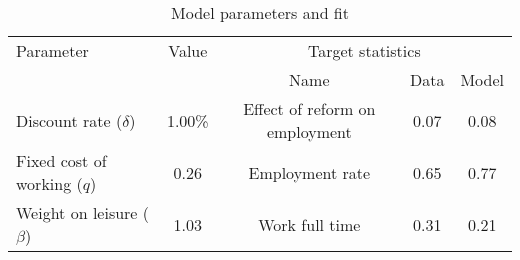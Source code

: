 \begin{table}[htbp]\caption{Model parameters and fit}\label{table:model_param}\centering\footnotesize\begin{tabular}{lcccc} \toprule  Parameter & Value & \multicolumn{3}{c}{Target statistics}  \\\cline{3-5}  &  &  Name & Data & Model  \\\midrule    Discount rate ($\delta$)      &1.00\%& Effect of reform on employment   & 0.07 &0.08\\ Fixed cost of working ($q$)   &0.26& Employment rate                  & 0.65 &0.77\\ Weight on leisure ($\beta$)   &1.03& Work full time             & 0.31 &0.21\\  \bottomrule\end{tabular}\end{table}